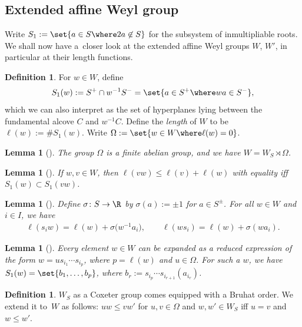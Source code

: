 \documentclass[10pt,a4paper]{amsart}
\newtheorem{Lemma}[Theorem]{Lemma}
\theoremstyle{definition}
\newtheorem{Definition}[Theorem]{Definition}
\numberwithin{equation}{section}
\begin{document}
\subsection{Extended affine Weyl group}
Write
$
 S_1:=\set{a\in S\where 2a\not\in S}
$
for the subsystem of inmultipliable roots. We shall now have a~closer look
at the extended affine Weyl groups $W$, $W'$, in particular at their length functions.

\begin{Definition}
 For $w\in W$, define
 \[
 S_1(w):=S^+\cap w^{-1} S^-
 = \set{a\in S^+\where wa\in S^-},
 \]
 which we can also interpret as the set of hyperplanes lying between the fundamental
 alcove $C$ and $w^{-1}C$. Define the \emph{length} of $W$ to be
$
 \ell(w) := \# S_1(w)$.
 Write $\Omega:=\set{w\in W\where \ell(w)=0}$.
\end{Definition}

\begin{Lemma}[{\cite[below equation~(2.2.3)]{macdonald}}]
 The group $\Omega$ is a finite abelian group, and we have
 $W=W_S\rtimes\Omega$.
\end{Lemma}

\begin{Lemma}[{\cite[Section~2.2.4]{macdonald}}]\label{sec:lem-lengths-add}
 If $w,v\in W$, then $\ell(vw)\le \ell(v)+\ell(w)$ with equality iff~${S_1(w)\subset S_1(vw)}$.
\end{Lemma}

\begin{Lemma}[{\cite[Section~2.2.8]{macdonald}}]\label{sec:lem-length-change}
 Define $\sigma\colon S\to\R$ by $\sigma(a):=\pm1$ for $a\in S^\pm$. For all
 $w\in W$ and $i\in I$, we have
 \begin{gather*}
 \ell(s_iw) = \ell(w) + \sigma\bigl(w^{-1}a_i\bigr),\qquad
 \ell(ws_i) = \ell(w) + \sigma(wa_i).
 \end{gather*}
\end{Lemma}

\begin{Lemma}[{\cite[Section~2.2.9]{macdonald}}]\label{sec:lem-flipped-roots}
 Every element $w\in W$ can be expanded as a reduced expression of the form
 $w=us_{i_1}\cdots s_{i_p}$, where $p=\ell(w)$ and $u\in\Omega$. For such a $w$, we have
$ S_1(w) = \set{b_1,\dots,b_p}$,
 where $b_r := s_{i_p}\cdots s_{i_{r+1}} (a_{i_r})$.
\end{Lemma}

\begin{Definition}
 $W_S$ as a Coxeter group comes equipped with a Bruhat order. We extend it to~$W$ as follows: $uw\le vw'$ for $u,v\in\Omega$ and $w,w'\in W_S$ iff
 $u=v$ and $w\le w'$.
\end{Definition}
\end{document}
